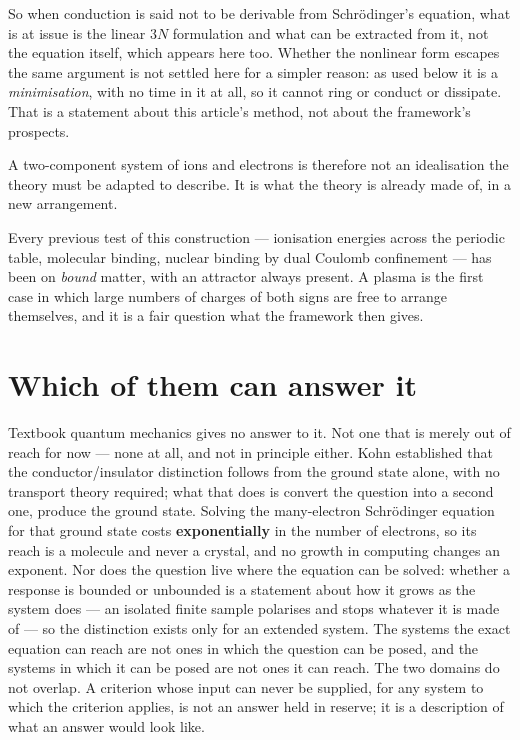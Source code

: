 \documentclass[11pt]{article}
\begin{document}
So when conduction is said not to be derivable from Schr\"odinger's equation, what is at issue is
the linear $3N$ formulation and what can be extracted from it, not the equation itself, which
appears here too. Whether the nonlinear form escapes the same argument is not settled here for a
simpler reason: as used below it is a \emph{minimisation}, with no time in it at all, so it cannot
ring or conduct or dissipate. That is a statement about this article's method, not about the
framework's prospects.

A two-component system of ions and electrons is therefore not an idealisation the theory must be
adapted to describe. It is what the theory is already made of, in a new arrangement.

Every previous test of this construction --- ionisation energies across the periodic table, molecular
binding, nuclear binding by dual Coulomb confinement \cite{realnucleus} --- has been on \emph{bound}
matter, with an attractor always present. A plasma is the first case in which large numbers of
charges of both signs are free to arrange themselves, and it is a fair question what the framework
then gives.

\section{Which of them can answer it}

Textbook quantum mechanics gives no answer to it. Not one that is merely out of reach for now ---
none at all, and not in principle either. Kohn established that the conductor/insulator distinction
follows from the ground state alone, with no transport theory required; what that does is convert
the question into a second one, produce the ground state. Solving the many-electron Schr\"odinger equation for that ground state costs
\textbf{exponentially} in the number of electrons, so its reach is a molecule and never a crystal,
and no growth in computing changes an exponent. Nor does the question live where the equation can be
solved: whether a response is bounded or unbounded is a statement about how it grows as the system
does --- an isolated finite sample polarises and stops whatever it is made of --- so the distinction
exists only for an extended system. The systems the exact equation can reach are not ones in which
the question can be posed, and the systems in which it can be posed are not ones it can reach. The
two domains do not overlap. A criterion whose input can never be supplied, for any system to which
the criterion applies, is not an answer held in reserve; it is a description of what an answer would
look like.
\end{document}
